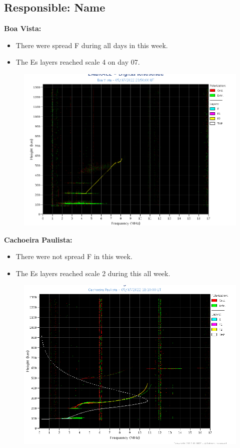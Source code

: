 \documentclass[a4paper, 10pt]{article}
\begin{document}
 \subsection{Responsible: Name} 
 
\textbf{Boa Vista: }

 \begin{itemize}
\item There were spread F during all days in this week.
\item The Es layers reached scale 4 on day 07. 
\end{itemize}
\begin{figure}[H]
    \centering
    \includegraphics[width=14cm]{./figures//BoaVista.png}
\end{figure}

\textbf{Cachoeira Paulista:}

 \begin{itemize}
\item There were not spread F in this week.
\item The Es layers reached scale 2 during this all week. 
\end{itemize}
\begin{figure}[H]
    \centering
    \includegraphics[width=14cm]{./figures//CachoeiraPaulista.png}
\end{figure}
\end{document}
